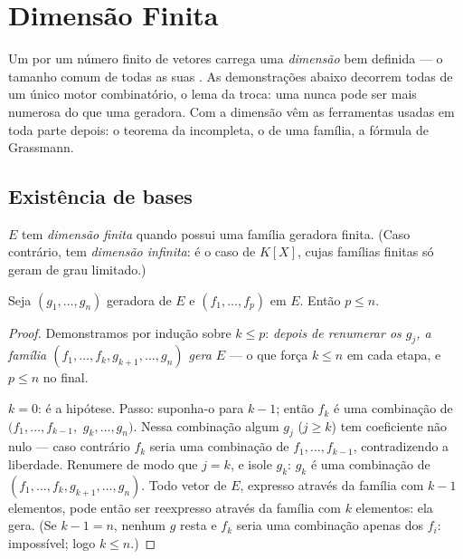 \chapter{Dimensão Finita}\label{ch:b1:findim}

Um  por um número finito de vetores carrega uma
\emph{dimensão} bem definida --- o tamanho comum de todas as suas
. As demonstrações abaixo decorrem todas de um único motor
combinatório, o lema da troca: uma  nunca pode ser mais
numerosa do que uma geradora. Com a dimensão vêm as ferramentas
usadas em toda parte depois: o teorema da  incompleta, o  de
uma família, a fórmula de Grassmann.

\section{Existência de bases}

\begin{definition}\label{def:b1:findim:def}
$E$ tem \emph{dimensão finita} quando possui
uma família geradora finita. (Caso contrário, tem \emph{dimensão
infinita}: é o caso de $K[X]$, cujas famílias finitas só geram
 de grau limitado.)
\end{definition}

\begin{theorem}\label{thm:b1:findim:exchange}
Seja $(g_1, \dots, g_n)$ geradora de $E$ e $(f_1, \dots, f_p)$  em $E$. Então $p \leq n$.
\end{theorem}

\begin{proof}
Demonstramos por indução sobre $k \leq p$: \emph{depois de renumerar os
$g_j$, a família $(f_1, \dots, f_k, g_{k+1}, \dots, g_n)$ gera $E$} --- o que força $k \leq n$ em cada
etapa, e $p \leq n$ no final.

$k = 0$: é a hipótese. Passo: suponha-o para $k - 1$; então $f_k$ é
uma combinação de $(f_1, \dots, f_{k-1},$ $g_k, \dots, g_n)$. Nessa combinação algum $g_j$ ($j \geq k$)
tem coeficiente não nulo ---
caso contrário $f_k$ seria uma combinação de $f_1, \dots, f_{k-1}$, contradizendo a
liberdade. Renumere de modo que $j = k$, e isole $g_k$: $g_k$ é uma
combinação de $(f_1, \dots, f_k, g_{k+1}, \dots,
g_n)$. Todo vetor de $E$, expresso através da família
com $k - 1$ elementos, pode então ser reexpresso através da família
com $k$ elementos: ela gera. (Se $k - 1 = n$, nenhum $g$ resta e $f_k$
seria uma combinação apenas dos $f_i$: impossível; logo $k \leq n$.)
\end{proof}

